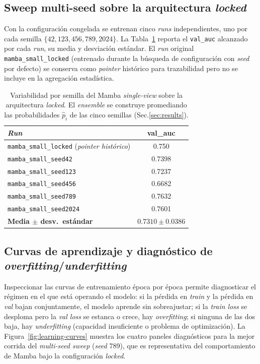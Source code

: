 \documentclass[11pt,a4paper]{article}
\begin{document}
\subsection{Sweep multi-seed sobre la arquitectura \textit{locked}}
\label{subsec:multi-seed-sweep}

Con la configuración congelada se entrenan cinco \textit{runs}
independientes, uno por cada semilla $\{42, 123, 456, 789, 2024\}$.
La Tabla~\ref{tab:seed-sweep} reporta el \texttt{val\_auc} alcanzado
por cada \textit{run}, su media y desviación estándar. El \textit{run}
original \texttt{mamba\_small\_locked} (entrenado durante la búsqueda
de configuración con \textit{seed} por defecto) se conserva como
\textit{pointer} histórico para trazabilidad pero no se incluye en la
agregación estadística.

\begin{table}[H]
\centering
\caption{Variabilidad por semilla del Mamba \textit{single-view} sobre
la arquitectura \textit{locked}. El \textit{ensemble} se construye
promediando las probabilidades $\hat{p}_i$ de las cinco semillas
(Sec.\ref{sec:results}).}
\label{tab:seed-sweep}
\begin{tabular}{lc}
\toprule
\textit{Run} & val\_auc \\
\midrule
\texttt{mamba\_small\_locked} (\textit{pointer histórico}) & 0.750 \\
\midrule
\texttt{mamba\_small\_seed42}    & 0.7398 \\
\texttt{mamba\_small\_seed123}   & 0.7237 \\
\texttt{mamba\_small\_seed456}   & 0.6682 \\
\texttt{mamba\_small\_seed789}   & 0.7632 \\
\texttt{mamba\_small\_seed2024}  & 0.7601 \\
\midrule
\textbf{Media $\pm$ desv.\ estándar} & \textbf{$0.7310 \pm 0.0386$} \\
\bottomrule
\end{tabular}
\end{table}

\subsection{Curvas de aprendizaje y diagnóstico de \textit{overfitting}/\textit{underfitting}}
\label{subsec:learning-curves}

Inspeccionar las curvas de entrenamiento época por época permite
diagnosticar el régimen en el que está operando el modelo: si la
pérdida en \textit{train} y la pérdida en \textit{val} bajan
conjuntamente, el modelo aprende sin sobreajustar; si la
\textit{train loss} se desploma pero la \textit{val loss} se estanca
o crece, hay \textit{overfitting}; si ninguna de las dos baja, hay
\textit{underfitting} (capacidad insuficiente o problema de
optimización). La Figura~\ref{fig:learning-curves} muestra los cuatro
paneles diagnósticos para la mejor corrida del \textit{multi-seed
sweep} (\textit{seed} 789), que es representativa del comportamiento
de Mamba bajo la configuración \textit{locked}.
\end{document}
